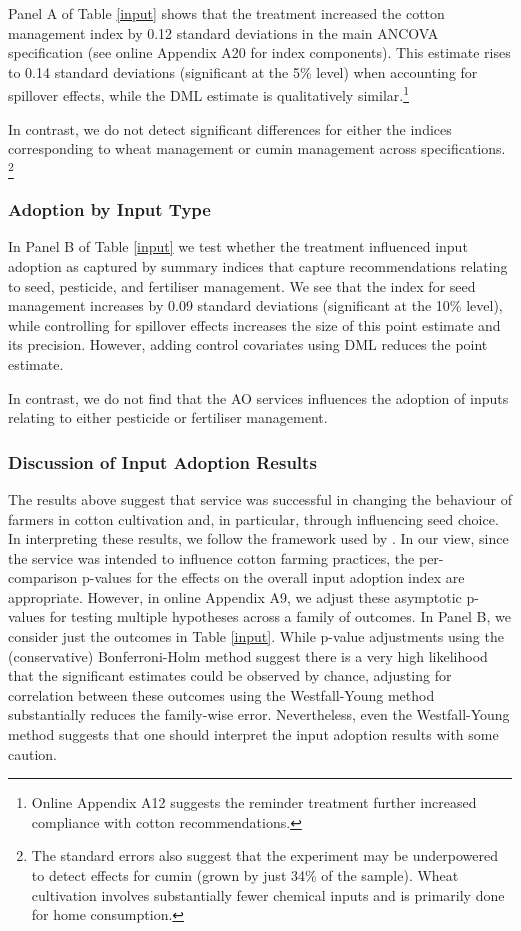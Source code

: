 \documentclass[12pt]{article}
\begin{document}
{{\normalsize Panel A of Table \ref*{input} shows that the treatment increased the cotton management index by 0.12 standard deviations in the main ANCOVA specification (see online Appendix A20 for index components). This estimate rises to 0.14 standard deviations (significant at the 5\% level) when accounting for spillover effects, while the DML estimate is qualitatively similar.\footnote{Online Appendix A12 suggests the reminder treatment further increased compliance with cotton recommendations.}

In contrast, we do not detect significant differences for either the indices corresponding to  wheat management or cumin management across specifications.%
\footnote{%
The standard errors also suggest that the experiment may be underpowered to
detect effects for cumin (grown by just 34\% of the sample). Wheat
cultivation involves substantially fewer chemical inputs and is primarily
done for home consumption.} }


\subsubsection{\protect\normalsize Adoption by Input Type}

In Panel B of Table \ref{input} we test whether the treatment influenced input adoption as captured by summary indices that capture recommendations relating to seed, pesticide, and fertiliser management. We see that the index for seed management increases by 0.09 standard deviations (significant at the 10\% level), while controlling for spillover effects increases the size of this point estimate and its precision. However,  adding control covariates using DML reduces the point estimate.

In contrast, we do not find that the AO services influences the adoption of inputs relating to either pesticide or fertiliser management.

\subsubsection{Discussion of Input Adoption Results} 

The results above suggest that service was successful in changing the behaviour of farmers in cotton cultivation and, in particular, through influencing seed choice. In interpreting these results, we follow the framework used by \citep{kling2007experimental}. In our view, since the service was intended to influence cotton farming practices, the per-comparison p-values for the effects on the overall input adoption index are appropriate. However, in online Appendix A9, we adjust these asymptotic p-values for testing multiple hypotheses across a family of outcomes. In Panel B, we consider just the outcomes in Table \ref{input}. While p-value adjustments using the (conservative) Bonferroni-Holm method suggest there is a very high likelihood that the significant estimates could be observed by chance, adjusting for correlation between these outcomes using the Westfall-Young method substantially reduces the family-wise error. Nevertheless, even the Westfall-Young method suggests that one should interpret the input adoption results with some caution. 

}
\end{document}
